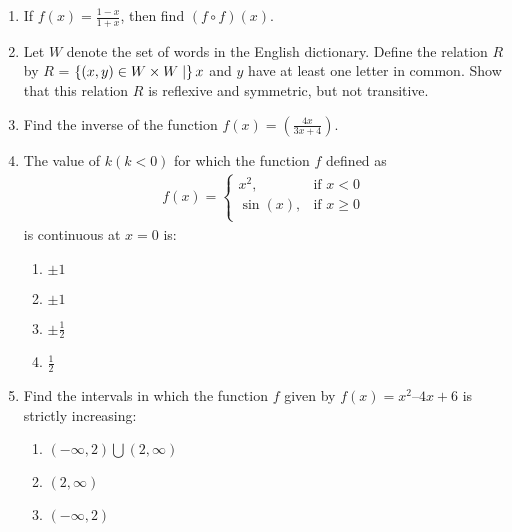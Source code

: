 
%
\begin{enumerate}

\item If $f(x) = \frac{1-x}{1+x}$, then find $(f\circ f)(x)$.


\item Let $W$ denote the set of words in the English dictionary. Define the relation $R$ by
$R$ = $\left\{(x, y) \in W \times W \mid\right\} x$ and $y$ have at least one letter in common.
Show that this relation $R$ is reflexive and symmetric, but not transitive.
\item Find the inverse of the function $f(x) = (\frac{4x}{3x+4})$.

\item The value of $k(k < 0)$ for which the function $f$ defined as 
\begin{align*}
f(x) = \begin{cases}
x^2, & \text{if } x < 0 \\
\sin(x), & \text{if } x \geq 0  \\
\end{cases}
\end{align*}
is continuous at $x = 0$ is:

\begin{enumerate}
     \item $\pm1$ 

     \item $\pm1$ 

     \item  $\pm\frac{1}{2}$ 

     \item  $\frac{1}{2}$ 

\end{enumerate}


\item Find the intervals in which the function $f$ given by $f(x) = x^2 – 4x + 6$ is strictly
increasing:

\begin{enumerate}

     \item $(-\infty,2) \bigcup (2,\infty)$ 
     
     \item $(2,\infty)$ 

     \item $(-\infty,2)$ 


\end{enumerate}
\end{enumerate}
